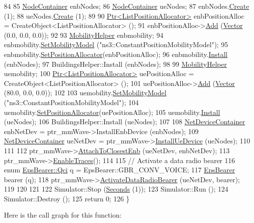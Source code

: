 \begin{DoxyCode}
84 
85   \hyperlink{classns3_1_1NodeContainer}{NodeContainer} enbNodes;
86   \hyperlink{classns3_1_1NodeContainer}{NodeContainer} ueNodes;
87   enbNodes.\hyperlink{classns3_1_1NodeContainer_a787f059e2813e8b951cc6914d11dfe69}{Create} (1);
88   ueNodes.\hyperlink{classns3_1_1NodeContainer_a787f059e2813e8b951cc6914d11dfe69}{Create} (1);
89 
90   \hyperlink{classns3_1_1Ptr}{Ptr<ListPositionAllocator>} enbPositionAlloc = 
      CreateObject<ListPositionAllocator> ();
91   enbPositionAlloc->\hyperlink{classns3_1_1ListPositionAllocator_a460e82f015ac012a73ba0ea0cccb3486}{Add} (\hyperlink{classns3_1_1Vector3D_a7e59b47bc94c9cb1dadff68c1d0112d8}{Vector} (0.0, 0.0, 0.0));
92 
93   \hyperlink{classns3_1_1MobilityHelper}{MobilityHelper} enbmobility;
94   enbmobility.\hyperlink{classns3_1_1MobilityHelper_a030275011b6f40682e70534d30280aba}{SetMobilityModel} (\textcolor{stringliteral}{"ns3::ConstantPositionMobilityModel"});
95   enbmobility.\hyperlink{classns3_1_1MobilityHelper_ac59d5295076be3cc11021566713a28c5}{SetPositionAllocator}(enbPositionAlloc);
96   enbmobility.\hyperlink{classns3_1_1MobilityHelper_a07737960ee95c0777109cf2994dd97ae}{Install} (enbNodes);
97   BuildingsHelper::Install (enbNodes);
98 
99   \hyperlink{classns3_1_1MobilityHelper}{MobilityHelper} uemobility;
100   \hyperlink{classns3_1_1Ptr}{Ptr<ListPositionAllocator>} uePositionAlloc = 
      CreateObject<ListPositionAllocator> ();
101   uePositionAlloc->\hyperlink{classns3_1_1ListPositionAllocator_a460e82f015ac012a73ba0ea0cccb3486}{Add} (\hyperlink{classns3_1_1Vector3D_a7e59b47bc94c9cb1dadff68c1d0112d8}{Vector} (80.0, 0.0, 0.0));
102 
103   uemobility.\hyperlink{classns3_1_1MobilityHelper_a030275011b6f40682e70534d30280aba}{SetMobilityModel} (\textcolor{stringliteral}{"ns3::ConstantPositionMobilityModel"});
104   uemobility.\hyperlink{classns3_1_1MobilityHelper_ac59d5295076be3cc11021566713a28c5}{SetPositionAllocator}(uePositionAlloc);
105   uemobility.\hyperlink{classns3_1_1MobilityHelper_a07737960ee95c0777109cf2994dd97ae}{Install} (ueNodes);
106   BuildingsHelper::Install (ueNodes);
107 
108   \hyperlink{classns3_1_1NetDeviceContainer}{NetDeviceContainer} enbNetDev = ptr\_mmWave->InstallEnbDevice (enbNodes);
109   \hyperlink{classns3_1_1NetDeviceContainer}{NetDeviceContainer} ueNetDev = ptr\_mmWave->\hyperlink{classns3_1_1MmWaveHelper_a9311c819d7ee539c8710c5b7e98df37a}{InstallUeDevice} (ueNodes);
110 
111 
112   ptr\_mmWave->\hyperlink{classns3_1_1MmWaveHelper_a202baea67b0af0d4fb6069de73766dc6}{AttachToClosestEnb} (ueNetDev, enbNetDev);
113   ptr\_mmWave->\hyperlink{classns3_1_1MmWaveHelper_a4eae3871876b62965d612d9a56ed21bc}{EnableTraces}();
114 
115   \textcolor{comment}{// Activate a data radio bearer}
116   \textcolor{keyword}{enum} \hyperlink{structns3_1_1EpsBearer_aecf0c67109c5eb4ec0b07226fff5885e}{EpsBearer::Qci} q = EpsBearer::GBR\_CONV\_VOICE;
117   \hyperlink{structns3_1_1EpsBearer}{EpsBearer} bearer (q);
118   ptr\_mmWave->\hyperlink{classns3_1_1MmWaveHelper_a9178ae3493484a9582039bb14edb282a}{ActivateDataRadioBearer} (ueNetDev, bearer);
119 
120 
121 
122   Simulator::Stop (\hyperlink{group__timecivil_ga33c34b816f8ff6628e33d5c8e9713b9e}{Seconds} (1));
123   Simulator::Run ();
124   Simulator::Destroy ();
125   \textcolor{keywordflow}{return} 0;
126 \}
\end{DoxyCode}


Here is the call graph for this function\+:



